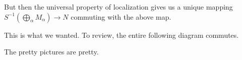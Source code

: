 But then the universal property of localization gives us a unique mapping $S^{-1}\left(\bigoplus_\alpha M_\alpha\right)\to N$ commuting with the above map.
\begin{center}
\end{center}
This is what we wanted. To review, the entire following diagram commutes.
\begin{center}
\end{center}
The pretty pictures are pretty.


